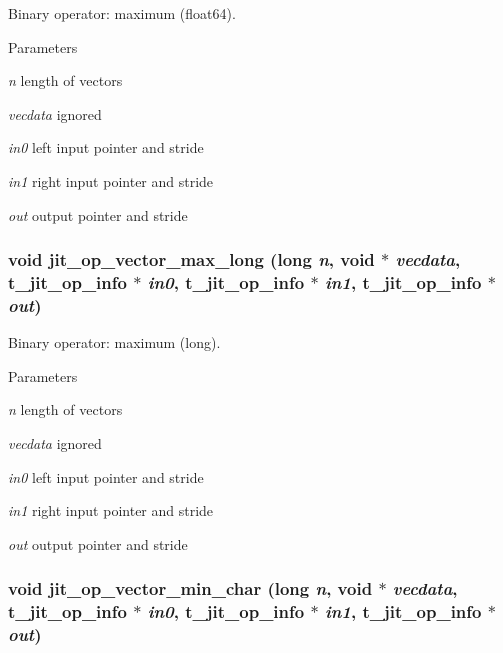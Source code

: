Binary operator: maximum (float64). 
\begin{DoxyParams}{Parameters}
\item[{\em n}]length of vectors \item[{\em vecdata}]ignored \item[{\em in0}]left input pointer and stride \item[{\em in1}]right input pointer and stride \item[{\em out}]output pointer and stride \end{DoxyParams}
\hypertarget{group__opvecmod_gad4e50db9a86b53204f8d1ff8305aedd0}{
\subsubsection[{jit\_\-op\_\-vector\_\-max\_\-long}]{\setlength{\rightskip}{0pt plus 5cm}void jit\_\-op\_\-vector\_\-max\_\-long (long {\em n}, \/  void $\ast$ {\em vecdata}, \/  {\bf t\_\-jit\_\-op\_\-info} $\ast$ {\em in0}, \/  {\bf t\_\-jit\_\-op\_\-info} $\ast$ {\em in1}, \/  {\bf t\_\-jit\_\-op\_\-info} $\ast$ {\em out})}}
\label{group__opvecmod_gad4e50db9a86b53204f8d1ff8305aedd0}


Binary operator: maximum (long). 
\begin{DoxyParams}{Parameters}
\item[{\em n}]length of vectors \item[{\em vecdata}]ignored \item[{\em in0}]left input pointer and stride \item[{\em in1}]right input pointer and stride \item[{\em out}]output pointer and stride \end{DoxyParams}
\hypertarget{group__opvecmod_ga276550a47face9505e6b9faf385a3ffb}{
\subsubsection[{jit\_\-op\_\-vector\_\-min\_\-char}]{\setlength{\rightskip}{0pt plus 5cm}void jit\_\-op\_\-vector\_\-min\_\-char (long {\em n}, \/  void $\ast$ {\em vecdata}, \/  {\bf t\_\-jit\_\-op\_\-info} $\ast$ {\em in0}, \/  {\bf t\_\-jit\_\-op\_\-info} $\ast$ {\em in1}, \/  {\bf t\_\-jit\_\-op\_\-info} $\ast$ {\em out})}}
\label{group__opvecmod_ga276550a47face9505e6b9faf385a3ffb}


